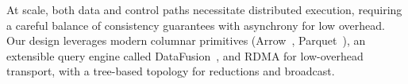 At scale, both data and control paths necessitate distributed execution, requiring a careful balance of consistency guarantees
with asynchrony for low overhead.
Our design leverages modern columnar primitives (Arrow~\cite{:ApacheArrow}, Parquet~\cite{:ApacheParquet}),
an extensible query engine called DataFusion~\cite{Lamb2024:DataFusion}, and RDMA for low-overhead transport,
with a tree-based topology for reductions and broadcast.


